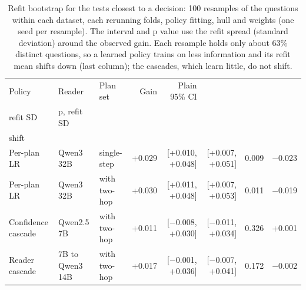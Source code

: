 \begin{table}[t]
\centering\small
\setlength{\tabcolsep}{4pt}
\caption{Refit bootstrap for the tests closest to a decision: 100 resamples of the questions within each dataset, each rerunning folds, policy fitting, hull and weights (one seed per resample). The interval and p value use the refit spread (standard deviation) around the observed gain. Each resample holds only about 63\% distinct questions, so a learned policy trains on less information and its refit mean shifts down (last column); the cascades, which learn little, do not shift.}
\label{tab:robust_refit}
\begin{tabular*}{\linewidth}{@{\extracolsep{\fill}}lllrrrrr}
\toprule
Policy & Reader & Plan set & Gain & Plain 95\% CI & \begin{tabular}[b]{@{}r@{}}Gain +/- 1.96 \\ refit SD\end{tabular} & p, refit SD & \begin{tabular}[b]{@{}r@{}}Refit mean \\ shift\end{tabular} \\
\midrule
Per-plan LR & Qwen3 32B & single-step & +0.029 & [+0.010, +0.048] & [+0.007, +0.051] & 0.009 & $-$0.023 \\
Per-plan LR & Qwen3 32B & with two-hop & +0.030 & [+0.011, +0.048] & [+0.007, +0.053] & 0.011 & $-$0.019 \\
Confidence cascade & Qwen2.5 7B & with two-hop & +0.011 & [$-$0.008, +0.030] & [$-$0.011, +0.034] & 0.326 & +0.001 \\
Reader cascade & 7B to Qwen3 14B & with two-hop & +0.017 & [$-$0.001, +0.036] & [$-$0.007, +0.041] & 0.172 & $-$0.002 \\
\bottomrule
\end{tabular*}
\end{table}
